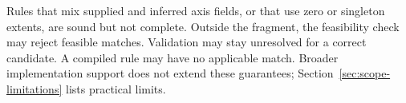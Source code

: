 Rules that mix supplied and inferred axis fields, or that use zero or
singleton extents, are sound but not complete. Outside the fragment, the
feasibility check may reject feasible matches. Validation may stay
unresolved for a correct candidate. A compiled rule may have no applicable
match. Broader implementation support does not extend these guarantees;
Section~\ref{sec:scope-limitations} lists practical limits.
